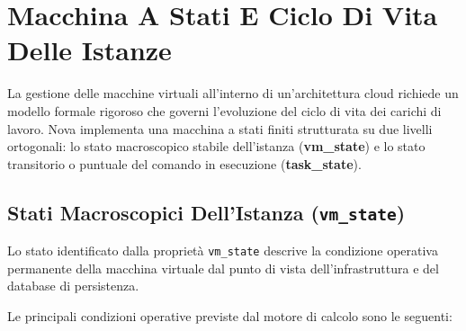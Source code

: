 \documentclass[11pt, a4paper]{article}
\begin{document}
\newpage

\section{Macchina A Stati E Ciclo Di Vita Delle Istanze}

La gestione delle macchine virtuali all'interno di un'architettura cloud richiede un modello formale rigoroso che governi l'evoluzione del ciclo di vita dei carichi di lavoro. Nova implementa una macchina a stati finiti strutturata su due livelli ortogonali: lo stato macroscopico stabile dell'istanza (\textbf{vm\_state}) e lo stato transitorio o puntuale del comando in esecuzione (\textbf{task\_state}).

\subsection{Stati Macroscopici Dell'Istanza (\texttt{vm\_state})}

Lo stato identificato dalla proprietà \texttt{vm\_state} descrive la condizione operativa permanente della macchina virtuale dal punto di vista dell'infrastruttura e del database di persistenza.


Le principali condizioni operative previste dal motore di calcolo sono le seguenti:
\end{document}
